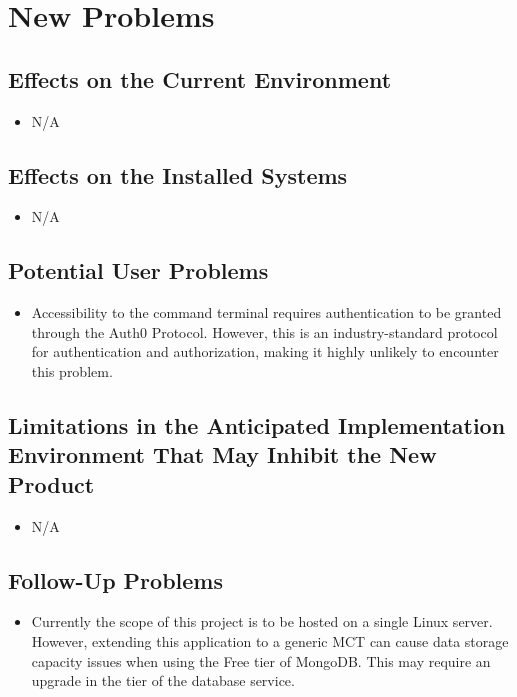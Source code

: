 \documentclass[12pt]{article}
\begin{document}
\section{New Problems}
\subsection{Effects on the Current Environment}
\begin{itemize}
    \item N/A
\end{itemize}

\subsection{Effects on the Installed Systems}
\begin{itemize}
    \item N/A
\end{itemize}

\subsection{Potential User Problems}
\begin{itemize}
    \item Accessibility to the command terminal requires authentication to be granted through the Auth0 Protocol. However, this is an industry-standard protocol for authentication and authorization, making it highly unlikely to encounter this problem.
\end{itemize}

\subsection{Limitations in the Anticipated Implementation Environment That May
Inhibit the New Product}
\begin{itemize}
    \item N/A
\end{itemize}

\subsection{Follow-Up Problems}
\begin{itemize}
    \item Currently the scope of this project is to be hosted on a single Linux server. However, extending this application to a generic MCT can cause data storage capacity issues when using the Free tier of MongoDB. This may require an upgrade in the tier of the database service.
\end{itemize}
\end{document}
